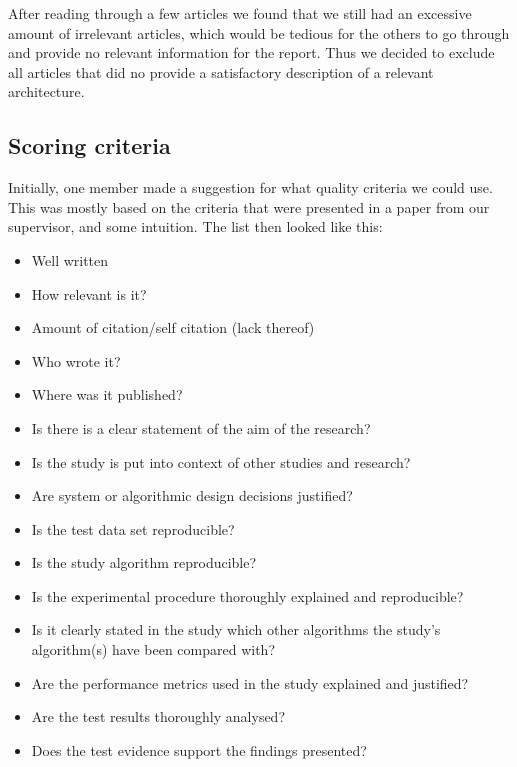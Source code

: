 After reading through a few articles we found that we still had an excessive amount of irrelevant articles, which would be tedious for the others to go through and provide no relevant information for the report. Thus we decided to exclude all articles that did no provide a satisfactory description of a relevant architecture.

\subsection{Scoring criteria}
\label{sub:scoring_criteria}
Initially, one member made a suggestion for what quality criteria we could use. This was mostly based on the criteria that were presented in a paper from our supervisor, and some intuition. The list then looked like this:
\begin{itemize}
\item Well written
\item How relevant is it?
\item Amount of citation/self citation (lack thereof)
\item Who wrote it?
\item Where was it published?
\item Is there is a clear statement of the aim of the research?
\item Is the study is put into context of other studies and research?
\item Are system or algorithmic design decisions justified?
\item Is the test data set reproducible?
\item Is the study algorithm reproducible?
\item Is the experimental procedure thoroughly explained and reproducible?
\item Is it clearly stated in the study which other algorithms the study’s algorithm(s) have been compared with?
\item Are the performance metrics used in the study explained and justified?
\item Are the test results thoroughly analysed?
\item Does the test evidence support the findings presented?
\end{itemize}

